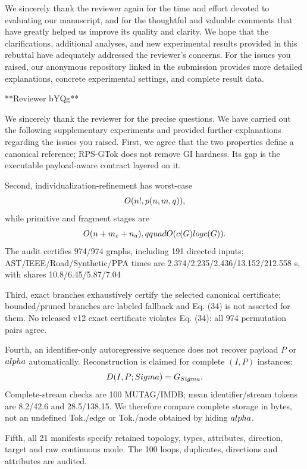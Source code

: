 We sincerely thank the reviewer again for the time and effort devoted to
evaluating our manuscript, and for the thoughtful and valuable comments that
have greatly helped us improve its quality and clarity. We hope that the
clarifications, additional analyses, and new experimental results provided in
this rebuttal have adequately addressed the reviewer's concerns. For the
issues you raised, our anonymous repository linked in the submission provides
more detailed explanations, concrete experimental settings, and complete
result data.

**Reviewer bYQg**

We sincerely thank the reviewer for the precise questions. We have carried out
the following supplementary experiments and provided further explanations
regarding the issues you raised. First, we agree that the two properties define
a canonical reference; RPS-GTok does not remove GI hardness. Its gap is the
executable payload-aware contract layered on it.

Second, individualization-refinement has worst-case
$$O(n!\\,p(n,m,q)),$$
while primitive and fragment stages are
$$O(n+m_e+n_a),\\qquad O(c(G)\\log c(G)).$$
The audit certifies 974/974 graphs, including 191 directed
inputs; AST/IEEE/Road/Synthetic/PPA times are
2.374/2.235/2.436/13.152/212.558 s, with shares 10.8/6.45/5.87/7.04%

Third, exact branches exhaustively certify the selected canonical certificate;
bounded/pruned branches are labeled fallback and Eq. (34) is not asserted for
them. No released v12 exact certificate violates Eq. (34): all 974 permutation
pairs agree.

Fourth, an identifier-only autoregressive sequence does not recover payload $P$
or $\\alpha$ automatically. Reconstruction is claimed for complete $(I,P)$ instances:
$$D(I,P;\\Sigma)=G_{\\Sigma}.$$ Complete-stream checks are 100%
MUTAG/IMDB; mean identifier/stream tokens are 8.2/42.6 and 28.5/138.15. We
therefore compare complete storage in bytes, not an undefined Tok./edge or
Tok./node obtained by hiding $\\alpha$.

Fifth, all 21 manifests specify retained topology, types, attributes, direction,
target and raw continuous mode. The 100%
loops, duplicates, directions and attributes are audited.

